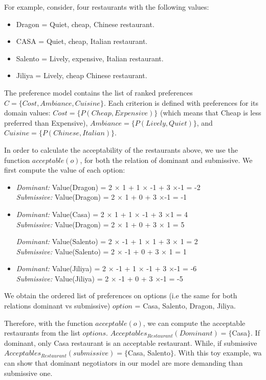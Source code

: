 \documentclass{article}
\begin{document}
\par For example, consider, four restaurants with the following values:
\begin{itemize}
	\item	Dragon = Quiet, cheap, Chinese restaurant.
	\item	CASA = Quiet, cheap, Italian restaurant.
	\item	Salento = Lively, expensive, Italian restaurant.
	\item   Jiliya = Lively, cheap Chinese restaurant.
\end{itemize}

The preference model contains the list of ranked preferences $C = \{Cost, Ambiance, Cuisine\}$. Each criterion is defined with preferences for its domain values: $ Cost = \{P(Cheap, Expensive)\}$ (which means that Cheap is less preferred than Expensive), $Ambiance= \{P(Lively, Quiet)\}$, and $Cuisine= \{P(Chinese, Italian)\}$.

In order to calculate the acceptability of the restaurants above, we use the function $acceptable(o)$, for both the relation of dominant and submissive. We first compute the value of each option:
\begin{itemize}
	\item \emph{Dominant:}	Value(Dragon) = 2 $\times$ 1 + 1 $\times$ -1 + 3 $\times$-1 = -2
	\\ \emph{Submissive:} Value(Dragon) = 2 $\times$ 1 + 0 + 3 $\times$-1 = -1
	
	\item \emph{Dominant:}	Value(Casa) = 2 $\times$ 1 + 1 $\times$ -1 + 3 $\times$1 = 4
	\\ \emph{Submissive:} Value(Dragon) = 2 $\times$ 1 + 0 + 3 $\times$ 1 = 5
	
	 \emph{Dominant:}	Value(Salento) = 2 $\times$ -1 + 1 $\times$ 1 + 3 $\times$ 1 = 2
	 \\ \emph{Submissive:} Value(Salento) = 2 $\times$ -1 + 0 + 3 $\times$ 1 = 1
	 
	\item \emph{Dominant:}	Value(Jiliya) = 2 $\times$ -1 + 1 $\times$ -1 + 3 $\times$-1 = -6
	\\ \emph{Submissive:} Value(Jiliya) = 2 $\times$ -1 + 0 + 3 $\times$-1 = -5
\end{itemize}
We obtain the ordered list of preferences on options (i.e the same for both relations dominant vs submissive) $option$ = {Casa, Salento, Dragon, Jiliya}.

Therefore, with  the function $acceptable(o)$, we can compute the acceptable restaurants from the list $options$. $Acceptables_{Restaurant}(Dominant) = \{$Casa$\}.$ If dominant, only Casa restaurant is an acceptable restaurant. While, if submissive $Acceptables_{Restaurant}(submissive) = \{$Casa, Salento$\}.$ With this toy example, wa can show that dominant negotiators in our model are more demanding than submissive one.
\end{document}
